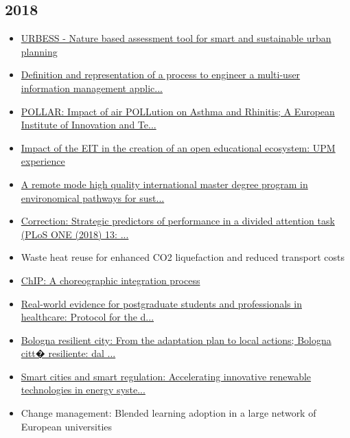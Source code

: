\subsection*{2018}
\begin{itemize}[leftmargin=*, itemsep=0em, label=\textbullet]
\small
\item \href{https://doi.org/10.17660/ActaHortic.2018.1215.14}{URBESS - Nature based assessment tool for smart and sustainable urban planning}
\item \href{https://doi.org/10.1109/EMBC.2018.8513368}{Definition and representation of a process to engineer a multi-user information management applic...}
\item \href{https://doi.org/10.1186/s13601-018-0221-z}{POLLAR: Impact of air POLLution on Asthma and Rhinitis; A European Institute of Innovation and Te...}
\item \href{https://doi.org/10.1108/IJIS-09-2017-0090}{Impact of the EIT in the creation of an open educational ecosystem: UPM experience}
\item \href{https://doi.org/10.1109/EDUCON.2018.8363240}{A remote mode high quality international master degree program in environomical pathways for sust...}
\item \href{https://doi.org/10.1371/journal.pone.0197309}{Correction: Strategic predictors of performance in a divided attention task (PLoS ONE (2018) 13: ...}
\item Waste heat reuse for enhanced CO2 liquefaction and reduced transport costs
\item \href{https://doi.org/10.1007/978-3-030-02671-4_2}{ChIP: A choreographic integration process}
\item \href{https://doi.org/10.1136/bmjopen-2018-025196}{Real-world evidence for postgraduate students and professionals in healthcare: Protocol for the d...}
\item \href{https://doi.org/10.13128/Techne-22103}{Bologna resilient city: From the adaptation plan to local actions; Bologna citt� resiliente: dal ...}
\item \href{https://doi.org/10.1093/oso/9780198822080.003.0004}{Smart cities and smart regulation: Accelerating innovative renewable technologies in energy syste...}
\item Change management: Blended learning adoption in a large network of European universities
\end{itemize}

